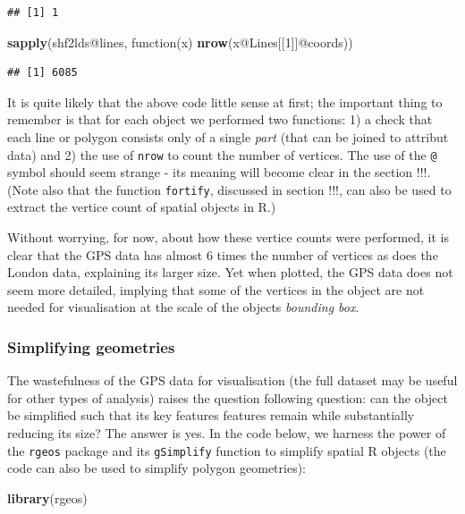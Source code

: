 \documentclass[]{article}
\newenvironment{Shaded}{}{}
\newcommand{\KeywordTok}[1]{\textcolor[rgb]{0.00,0.44,0.13}{\textbf{{#1}}}}
\newcommand{\DecValTok}[1]{\textcolor[rgb]{0.25,0.63,0.44}{{#1}}}
\newcommand{\NormalTok}[1]{{#1}}
\begin{document}
\begin{verbatim}
## [1] 1
\end{verbatim}

\begin{Shaded}
\begin{Highlighting}[]
\KeywordTok{sapply}\NormalTok{(shf2lds@lines, function(x) }\KeywordTok{nrow}\NormalTok{(x@Lines[[}\DecValTok{1}\NormalTok{]]@coords))}
\end{Highlighting}
\end{Shaded}

\begin{verbatim}
## [1] 6085
\end{verbatim}

It is quite likely that the above code little sense at first; the
important thing to remember is that for each object we performed two
functions: 1) a check that each line or polygon consists only of a
single \emph{part} (that can be joined to attribut data) and 2) the use
of \texttt{nrow} to count the number of vertices. The use of the
\texttt{@} symbol should seem strange - its meaning will become clear in
the section !!!. (Note also that the function \texttt{fortify},
discussed in section !!!, can also be used to extract the vertice count
of spatial objects in R.)

Without worrying, for now, about how these vertice counts were
performed, it is clear that the GPS data has almost 6 times the number
of vertices as does the London data, explaining its larger size. Yet
when plotted, the GPS data does not seem more detailed, implying that
some of the vertices in the object are not needed for visualisation at
the scale of the objects \emph{bounding box}.

\subsubsection{Simplifying geometries}

The wastefulness of the GPS data for visualisation (the full dataset may
be useful for other types of analysis) raises the question following
question: can the object be simplified such that its key features
features remain while substantially reducing its size? The answer is
yes. In the code below, we harness the power of the \texttt{rgeos}
package and its \texttt{gSimplify} function to simplify spatial R
objects (the code can also be used to simplify polygon geometries):

\begin{Shaded}
\begin{Highlighting}[]
\KeywordTok{library}\NormalTok{(rgeos)}
\end{Highlighting}
\end{Shaded}
\end{document}
